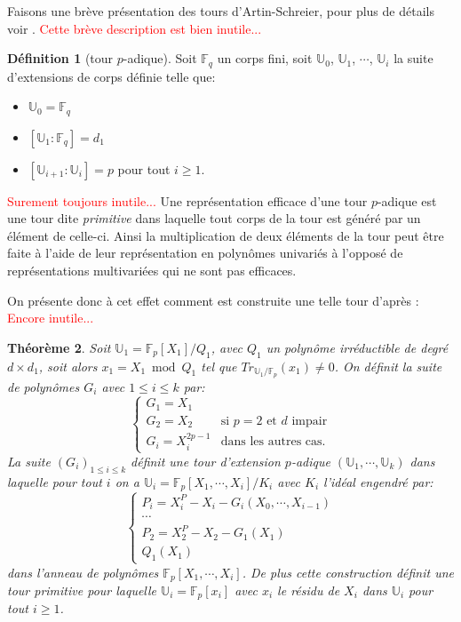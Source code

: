 \documentclass[10pt,a4paper]{book}
\theoremstyle{plain}
\newtheorem{thm}{Théorème}[chapter]
\theoremstyle{definition}
\theoremstyle{definition}
\theoremstyle{definition}
\theoremstyle{definition}
\newtheorem{defi}[thm]{Définition}
\theoremstyle{remark}
\theoremstyle{remark}
\theoremstyle{definition}
\begin{document}
Faisons une brève présentation des tours d'Artin-Schreier, pour plus de détails voir \cite{DeFeo-Shost'12}.
\textcolor{red}{Cette brève description est bien inutile...}
\begin{defi}[tour $p$-adique]
Soit $\mathbb{F}_q$ un corps fini, soit $\mathbb{U}_0$, $\mathbb{U}_1$, $\cdots$, $\mathbb{U}_i$ la suite d'extensions de corps définie telle que:
\begin{itemize}
\item $\mathbb{U}_0=\mathbb{F}_q$
\item $[\mathbb{U}_1 : \mathbb{F}_q]= d_1$
\item $[\mathbb{U}_{i+1} :\mathbb{U}_i]= p$ pour tout $i \geqslant 1$.
\end{itemize}
\end{defi}
\textcolor{red}{Surement toujours inutile...}
Une représentation efficace d'une tour $p$-adique est une tour dite \emph{primitive} dans laquelle tout corps de la tour est généré par un élément de celle-ci. Ainsi la multiplication de deux éléments de la tour peut être faite à l'aide de leur représentation en polynômes univariés à l'opposé de représentations multivariées qui ne sont pas efficaces.

On présente donc à cet effet comment est construite une telle tour d'après \cite{DeFeo-Shost'12}:
\textcolor{red}{Encore inutile...}
\begin{thm}
Soit $\mathbb{U}_1=\mathbb{F}_p[X_1]/Q_1$, avec $Q_1$ un polynôme irréductible de degré $d \times d_1$, soit alors $x_1=X_1 \bmod Q_1$ tel que $Tr_{\mathbb{U}_1/\mathbb{F}_p}(x_1)\neq 0$. On définit la suite de polynômes $G_i$ avec $ 1 \leqslant i \leqslant k$ par:
\begin{equation}
\begin{cases}
G_1=X_1 & \\
G_2=X_2 & \text{si } p=2 \text{ et } d \text{ impair} \\
G_i=X_i^{2p-1} & \text{dans les autres cas.} 
\end{cases}
\end{equation}
La suite $(G_i)_{1 \leqslant i \leqslant k }$ définit une \emph{tour d'extension $p$-adique} $(\mathbb{U}_1, \cdots, \mathbb{U}_k)$ dans laquelle pour tout $i$ on a $\mathbb{U}_i=\mathbb{F}_p[X_1, \cdots, X_i]/K_i$ avec $K_i$ l'idéal engendré par:
\begin{equation}
\begin{cases}
P_i=X_i^P-X_i-G_i(X_0, \cdots,X_{i-1}) \\
\cdots \\
P_2=X_2^P-X_2-G_1(X_1)\\
Q_1(X_1)
\end{cases}
\end{equation}
dans l'anneau de polynômes $\mathbb{F}_p[X_1, \cdots, X_i]$. De plus cette construction définit une tour primitive pour laquelle $\mathbb{U}_i=\mathbb{F}_p[x_i]$ avec $x_i$ le résidu de $X_i$ dans $\mathbb{U}_i$ pour tout $i \geqslant 1$.    
\end{thm} 
\end{document}
